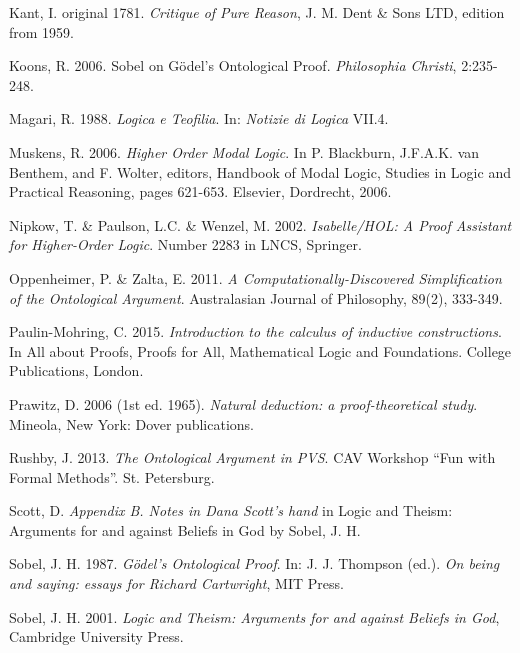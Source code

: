 \documentclass[smallextended]{svjour3}
\begin{document}
\begin{thebibliography}{9}
Kant, I.  original 1781. {\itshape Critique of Pure Reason}, J. M. Dent \& Sons LTD, edition from 1959.

Koons, R. 2006. Sobel on G\"odel's Ontological Proof. {\itshape Philosophia Christi}, 2:235-248.

Magari, R. 1988. {\itshape Logica e Teofilia}. In: {\itshape Notizie di Logica} VII.4.

Muskens, R. 2006. {\itshape Higher Order Modal Logic}. In P. Blackburn, J.F.A.K. van Benthem, and F. Wolter, editors, Handbook of Modal Logic, Studies in Logic and Practical Reasoning, pages 621-653. Elsevier, Dordrecht, 2006.

 Nipkow, T. \& Paulson, L.C. \& Wenzel, M. 2002. {\itshape Isabelle/HOL: A Proof Assistant for
Higher-Order Logic}. Number 2283 in LNCS, Springer.

Oppenheimer, P. \& Zalta, E. 2011. {\itshape A Computationally-Discovered Simplification of the Ontological Argument}. Australasian Journal of Philosophy, 89(2), 333-349.

 Paulin-Mohring, C. 2015. {\itshape Introduction to the calculus of inductive constructions}. In %
All about Proofs, Proofs for All,
Mathematical Logic and Foundations. College Publications, London.

Prawitz, D. 2006 (1st ed. 1965). {\itshape Natural deduction: a proof-theoretical study}. Mineola, New York: Dover publications. 

Rushby, J. 2013. {\itshape The Ontological Argument in PVS}. CAV Workshop ``Fun with Formal Methods''. St. Petersburg.


Scott, D. {\itshape Appendix B. Notes in Dana Scott's hand} in Logic and Theism: Arguments for and against Beliefs in God by Sobel, J. H. 

Sobel, J. H. 1987. {\itshape G\"odel's Ontological Proof}. In: J. J. Thompson (ed.). {\itshape On being and saying: essays for Richard Cartwright},  MIT Press. 

Sobel, J. H. 2001. {\itshape Logic and Theism: Arguments for and against Beliefs in God}, Cambridge University Press. 


\end{thebibliography}
\end{document}
